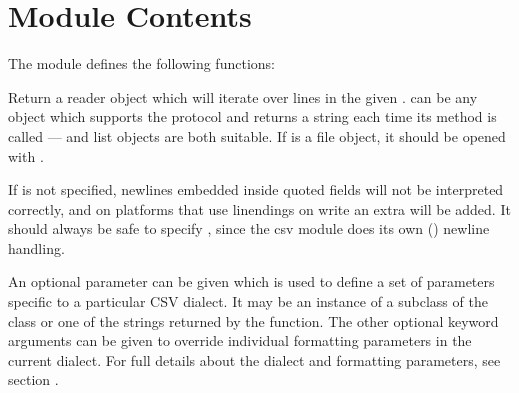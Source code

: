 \documentclass[letterpaper,10pt,english]{sphinxmanual}
\begin{document}
\section{Module Contents}
\label{\detokenize{csv:module-contents}}\label{\detokenize{csv:csv-contents}}
The {\hyperref[\detokenize{csv:module-csv}]{}} module defines the following functions:

\ignorespaces {}

\vspace{5px}

\begin{fulllineitems}
\label{\detokenize{csv:csv.reader}}
Return a reader object which will iterate over lines in the given .
 can be any object which supports the  protocol and returns a
string each time its  method is called —  and list objects are both suitable.   If  is a file object,
it should be opened with .
\begin{footnote}[1]\sphinxAtStartFootnote
If  is not specified, newlines embedded inside quoted fields
will not be interpreted correctly, and on platforms that use  linendings
on write an extra  will be added.  It should always be safe to specify
, since the csv module does its own
() newline handling.
%
\end{footnote}  An optional
 parameter can be given which is used to define a set of parameters
specific to a particular CSV dialect.  It may be an instance of a subclass of
the {\hyperref[\detokenize{csv:csv.Dialect}]{}} class or one of the strings returned by the
{\hyperref[\detokenize{csv:csv.list_dialects}]{}} function.  The other optional  keyword arguments
can be given to override individual formatting parameters in the current
dialect.  For full details about the dialect and formatting parameters, see
section {\hyperref[\detokenize{csv:csv-fmt-params}]{}}.


\end{fulllineitems}
\end{document}
